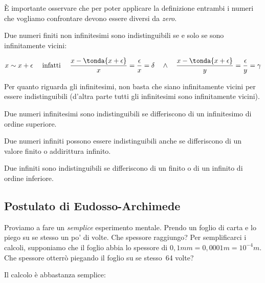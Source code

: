 \begin{osservazione}
 È importante osservare che per poter applicare la definizione entrambi i 
numeri che vogliamo confrontare devono essere diversi da \emph{zero}.
\end{osservazione}

\begin{definizione}
Due numeri finiti non infinitesimi sono indistinguibili se e solo se 
sono infinitamente vicini:

\[x \sim x+\epsilon \quad \text{ infatti } \quad
\frac{x-\tonda{x+\epsilon}}{x} = \frac{\epsilon}{x}= \delta \quad \wedge \quad 
\frac{x-\tonda{x+\epsilon}}{y} = \frac{\epsilon}{y}= \gamma
\]

\end{definizione}


Per quanto riguarda gli infinitesimi, non basta che siano infinitamente vicini 
per essere indistinguibili (d'altra parte tutti gli infinitesimi sono 
infinitamente vicini).

\begin{definizione}
Due numeri infinitesimi sono indistinguibili se differiscono di un 
infinitesimo di ordine superiore.
\end{definizione}

Due numeri infiniti possono essere indistinguibili anche se differiscono di un 
valore finito o addirittura infinito. 

\begin{definizione}
Due infiniti sono indistinguibili se 
differiscono di un finito o di un infinito di ordine inferiore.
\end{definizione}


\subsection{Postulato di Eudosso-Archimede}
\label{subsec:insnum_eudossoarchimede}

Proviamo a fare un \emph{semplice} esperimento mentale. Prendo un foglio di 
carta e lo piego su se stesso un po' di volte. Che spessore raggiungo?
Per semplificarci i calcoli, supponiamo che il foglio abbia lo spessore 
di $0,1mm = 0,0001m = 10^{-4}m$. 
Che spessore otterrò piegando il foglio su se stesso~64 volte?

Il calcolo è abbastanza semplice:

